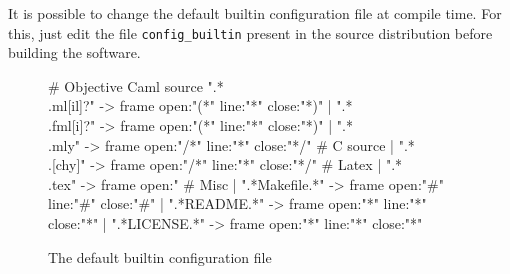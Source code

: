 \documentclass{article}
\begin{document}
It is possible to change the default builtin configuration file at
compile time.  For this, just edit the file \verb+config_builtin+
present in the source distribution before building the software.


\begin{figure}
\begin{center}
\begin{boxedverbatim}
# Objective Caml source
  ".*\\.ml[il]?" -> frame open:"(*" line:"*" close:"*)"
| ".*\\.fml[i]?" -> frame open:"(*" line:"*" close:"*)"
| ".*\\.mly"     -> frame open:"/*" line:"*" close:"*/"
# C source
| ".*\\.[chy]"    -> frame open:"/*" line:"*" close:"*/"
# Latex
| ".*\\.tex"     -> frame open:"%
# Misc
| ".*Makefile.*" -> frame open:"#"  line:"#" close:"#"
| ".*README.*"   -> frame open:"*"  line:"*" close:"*"
| ".*LICENSE.*"  -> frame open:"*"  line:"*" close:"*"
\end{boxedverbatim}
\end{center}
  \caption{The default builtin configuration file}
  \label{figure:config}
\end{figure}
\end{document}
